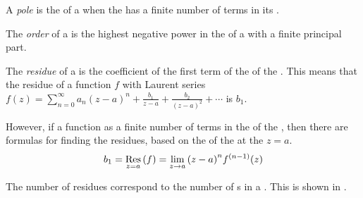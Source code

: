 \begin{definition}[Pole]\label{def:Pole}
  A \emph{pole} is the  of a  when the  has a finite number of terms in its .
\end{definition}

\begin{definition}[Order]\label{def:Pole_Order}
  The \emph{order} of a  is the highest negative power in the  of a  with a finite principal part.
\end{definition}

\begin{definition}[Residue]\label{def:Residue}
  The \emph{residue} of a  is the coefficient of the first term of the  of the .
  This means that the residue of a function $f$ with Laurent series $f(z) = \sum_{n=0}^{\infty} a_{n} {(z-a)}^{n} + \frac{b_{1}}{z-a} + \frac{b_{2}}{{(z-a)}^{2}} + \cdots$ is $b_{1}$.

  However, if a function as a finite number of terms in the  of the , then there are formulas for finding the residues, based on the  of the  at the  $z=a$.
  \begin{equation}\label{eq:Residue}
    b_{1} = \Residue{f}{z=a} = \lim\limits_{z \to a} {(z-a)}^{n} f^{(n-1)}(z)
  \end{equation}

  The number of residues correspond to the number of s in a .
  This is shown in .
\end{definition}


